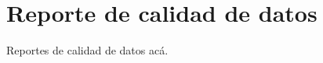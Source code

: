 \chapter{Reporte de calidad de datos}
\label{appendix:data-quality}

Reportes de calidad de datos acá.
